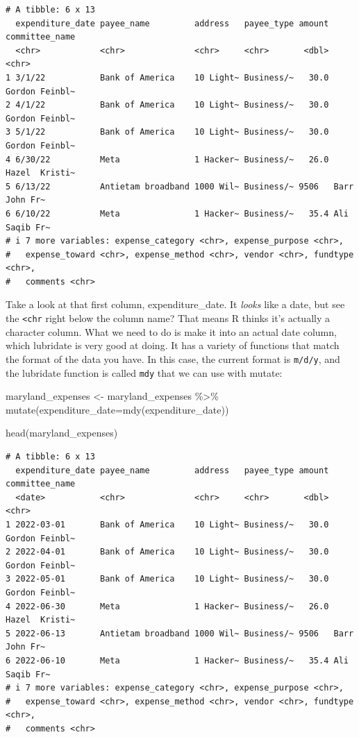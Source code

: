 \documentclass[
  letterpaper,
  DIV=11,
  numbers=noendperiod]{scrreprt}
\newenvironment{Shaded}{\begin{snugshade}}{\end{snugshade}}
\newcommand{\AttributeTok}[1]{\textcolor[rgb]{0.40,0.45,0.13}{#1}}
\newcommand{\FunctionTok}[1]{\textcolor[rgb]{0.28,0.35,0.67}{#1}}
\newcommand{\NormalTok}[1]{\textcolor[rgb]{0.00,0.23,0.31}{#1}}
\newcommand{\OtherTok}[1]{\textcolor[rgb]{0.00,0.23,0.31}{#1}}
\newcommand{\SpecialCharTok}[1]{\textcolor[rgb]{0.37,0.37,0.37}{#1}}
\begin{document}
\begin{verbatim}
# A tibble: 6 x 13
  expenditure_date payee_name         address   payee_type amount committee_name
  <chr>            <chr>              <chr>     <chr>       <dbl> <chr>         
1 3/1/22           Bank of America    10 Light~ Business/~   30.0 Gordon Feinbl~
2 4/1/22           Bank of America    10 Light~ Business/~   30.0 Gordon Feinbl~
3 5/1/22           Bank of America    10 Light~ Business/~   30.0 Gordon Feinbl~
4 6/30/22          Meta               1 Hacker~ Business/~   26.0 Hazel  Kristi~
5 6/13/22          Antietam broadband 1000 Wil~ Business/~ 9506   Barr  John Fr~
6 6/10/22          Meta               1 Hacker~ Business/~   35.4 Ali  Saqib Fr~
# i 7 more variables: expense_category <chr>, expense_purpose <chr>,
#   expense_toward <chr>, expense_method <chr>, vendor <chr>, fundtype <chr>,
#   comments <chr>
\end{verbatim}

Take a look at that first column, expenditure\_date. It \emph{looks}
like a date, but see the \texttt{\textless{}chr} right below the column
name? That means R thinks it's actually a character column. What we need
to do is make it into an actual date column, which lubridate is very
good at doing. It has a variety of functions that match the format of
the data you have. In this case, the current format is \texttt{m/d/y},
and the lubridate function is called \texttt{mdy} that we can use with
mutate:

\begin{Shaded}
\begin{Highlighting}[]
\NormalTok{maryland\_expenses }\OtherTok{\textless{}{-}}\NormalTok{ maryland\_expenses }\SpecialCharTok{\%\textgreater{}\%} \FunctionTok{mutate}\NormalTok{(}\AttributeTok{expenditure\_date=}\FunctionTok{mdy}\NormalTok{(expenditure\_date))}

\FunctionTok{head}\NormalTok{(maryland\_expenses)}
\end{Highlighting}
\end{Shaded}

\begin{verbatim}
# A tibble: 6 x 13
  expenditure_date payee_name         address   payee_type amount committee_name
  <date>           <chr>              <chr>     <chr>       <dbl> <chr>         
1 2022-03-01       Bank of America    10 Light~ Business/~   30.0 Gordon Feinbl~
2 2022-04-01       Bank of America    10 Light~ Business/~   30.0 Gordon Feinbl~
3 2022-05-01       Bank of America    10 Light~ Business/~   30.0 Gordon Feinbl~
4 2022-06-30       Meta               1 Hacker~ Business/~   26.0 Hazel  Kristi~
5 2022-06-13       Antietam broadband 1000 Wil~ Business/~ 9506   Barr  John Fr~
6 2022-06-10       Meta               1 Hacker~ Business/~   35.4 Ali  Saqib Fr~
# i 7 more variables: expense_category <chr>, expense_purpose <chr>,
#   expense_toward <chr>, expense_method <chr>, vendor <chr>, fundtype <chr>,
#   comments <chr>
\end{verbatim}
\end{document}
